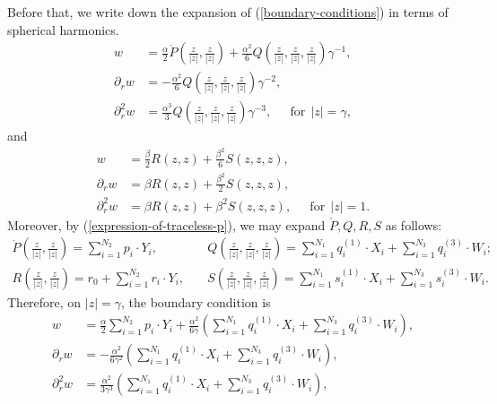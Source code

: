 \documentclass[11pt,letterpaper]{amsart}
\theoremstyle{definition}
\theoremstyle{remark}
\numberwithin{equation}{section}
\begin{document}
Before that, we write down the expansion of (\ref{boundary-conditions}) in terms of spherical harmonics.
\begin{equation}
    \begin{split}
        w&=\frac{\alpha}{2}\mathring{P}\left(\frac{z}{|z|},\frac{z}{|z|} \right)+\frac{\alpha^2}{6}Q\left(\frac{z}{|z|},\frac{z}{|z|},\frac{z}{|z|} \right)\gamma^{-1},\\
        \partial_r w&=-\frac{\alpha^2}{6}Q\left(\frac{z}{|z|},\frac{z}{|z|},\frac{z}{|z|} \right)\gamma^{-2},\\
        \partial^2_r w&=\frac{\alpha^3}{3}Q\left(\frac{z}{|z|},\frac{z}{|z|},\frac{z}{|z|} \right)\gamma^{-3}, \quad ~~\mbox{for}~~ |z|=\gamma,
    \end{split}
\end{equation}
and 
\begin{equation}
    \begin{split}
        w&=\frac{\beta}{2}R\left(z,z \right)+\frac{\beta^2}{6}S\left(z,z,z \right),\\
        \partial_r w&=\beta R\left(z,z \right)+\frac{\beta^2}{2}S\left(z,z,z \right),\\
        \partial^2_r w&=\beta R\left(z,z \right)+\beta^2 S\left(z,z,z \right), \quad ~~\mbox{for}~~ |z|=1.
    \end{split}
\end{equation}
Moreover, by (\ref{expression-of-traceless-p}), we may expand $\mathring{P}, Q, R, S$ as follows:
\begin{equation}\label{PQRS-expansion}
    \begin{split}
        \mathring{P}\left(\frac{z}{|z|},\frac{z}{|z|} \right)=\sum_{i=1}^{N_2}p_i\cdot Y_i, &\quad Q\left(\frac{z}{|z|},\frac{z}{|z|},\frac{z}{|z|} \right)=\sum_{i=1}^{N_1} q^{(1)}_i\cdot X_i+\sum_{i=1}^{N_3}q^{(3)}_i \cdot W_i;\\
        R\left(\frac{z}{|z|},\frac{z}{|z|} \right)=r_0+\sum_{i=1}^{N_2}r_i\cdot Y_i, &\quad S\left(\frac{z}{|z|},\frac{z}{|z|},\frac{z}{|z|} \right)=\sum_{i=1}^{N_1} s^{(1)}_i\cdot X_i+\sum_{i=1}^{N_3}s^{(3)}_i\cdot W_i.
    \end{split}
\end{equation}
Therefore, on $|z|=\gamma$, the boundary condition is
\begin{equation}
    \begin{split}
        w&=\frac{\alpha}{2}\sum_{i=1}^{N_2}p_i\cdot Y_i+\frac{\alpha^2}{6\gamma}\left(\sum_{i=1}^{N_1} q^{(1)}_i\cdot X_i+\sum_{i=1}^{N_3}q^{(3)}_i \cdot W_i\right),\\
        \partial_r w&=-\frac{\alpha^2}{6\gamma^2}\left(\sum_{i=1}^{N_1} q^{(1)}_i\cdot X_i+\sum_{i=1}^{N_3}q^{(3)}_i \cdot W_i\right),\\
        \partial^2_r w&=\frac{\alpha^2}{3\gamma^3}\left(\sum_{i=1}^{N_1} q^{(1)}_i\cdot X_i+\sum_{i=1}^{N_3}q^{(3)}_i \cdot W_i\right),
    \end{split}
\end{equation}
\end{document}
